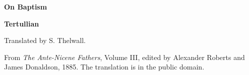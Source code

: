 \documentclass[11pt,letterpaper]{article}
\begin{document}
\color{ink}

\begin{titlepage}
\centering
\vspace*{4em}
{\LARGE\bfseries\color{heading} On Baptism\par}
\vspace{2em}
{\LARGE\bfseries\color{heading} Tertullian\par}
\vspace{3em}
{Translated by S. Thelwall.\par}
\vfill
{\small From \emph{The Ante-Nicene Fathers}, Volume III, edited by
Alexander Roberts and James Donaldson, 1885. The translation is in the
public domain.\par}
\vspace{2em}
\end{titlepage}

\tableofcontents
\clearpage


\end{document}
